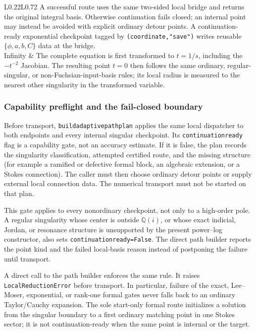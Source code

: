 \documentclass[11pt]{article}
\renewcommand{\_}{\origunderscore\allowbreak}
\begin{document}
\begin{longtable}{L{0.22\textwidth}L{0.72\textwidth}}
A successful route uses
the same two-sided local bridge and returns the original integral basis.  Otherwise
continuation fails closed; an internal point may instead be avoided with explicit ordinary
detour points.  A continuation-ready exponential checkpoint tagged by
\texttt{(coordinate,"save")} writes reusable $\{\phi,a,b,C\}$ data at the bridge. \\
Infinity & The complete equation is first transformed to $t=1/s$, including the
$-t^{-2}$ Jacobian.  The resulting point $t=0$ then follows the same ordinary,
regular-singular, or non-Fuchsian-input-basis rules; its local radius is measured to the
nearest other singularity in the transformed variable. \\
\bottomrule
\end{longtable}
\normalsize

\subsubsection{Capability preflight and the fail-closed boundary}

Before transport, \texttt{build\_adaptive\_path\_plan} applies the same local dispatcher to
both endpoints and every internal singular checkpoint.  Its
\texttt{continuation\_ready} flag is a capability gate, not an accuracy estimate.  If it is
false, the plan records the singularity classification, attempted certified route, and the
missing structure (for example a ramified or defective formal block, an algebraic extension,
or a Stokes connection).  The caller must then choose ordinary detour points or supply external
local connection data.  The numerical transport must not be started on that plan.

This gate applies to every nonordinary checkpoint, not only to a high-order pole.  A regular
singularity whose center is outside $\mathbb Q(i)$, or whose exact indicial, Jordan, or
resonance structure is unsupported by the present power--log constructor, also sets
\texttt{continuation\_ready=False}.  The direct path builder reports the point kind and the
failed local-basis reason instead of postponing the failure until transport.

A direct call to the path builder enforces the same rule.  It raises
\texttt{LocalReductionError} before transport.  In particular, failure of the exact, Lee--Moser, exponential,
or rank-one formal gates never falls back to an ordinary Taylor/Cauchy expansion.  The sole
start-only formal route initializes a solution from the singular boundary to a first ordinary
matching point in one Stokes sector; it is not continuation-ready when the same point is
internal or the target.
\end{document}
